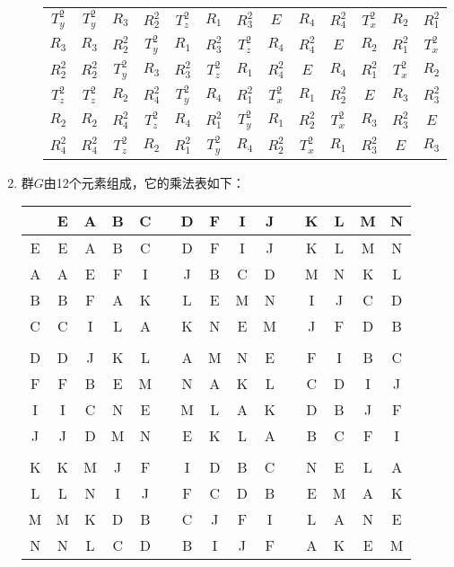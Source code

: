 \documentclass[reqno,a4paper,12pt]{amsart}
\begin{document}
\begin{enumerate}[1.]
\begin{tcolorbox}[breakable, colback = black!5!white, colframe = black]
\begin{enumerate}[(1)]
\begin{table}[H]
\begin{tabular}{|c|ccc|ccc|ccc|ccc|}
	\hline 
	$T_y^2$ & $T_y^2$ & $R_3$ & $R_2^2$ & $T_z^2$ & $R_1$ & $R_3^2$ & $E$ & $R_4$ & $R_4^2$ & $T_x^2$ & $R_2$ & $R_1^2$ \\
	$R_3$ & $R_3$ & $R_2^2$ & $T_y^2$ & $R_1$ & $R_3^2$ & $T_z^2$ & $R_4$ & $R_4^2$ & $E$ & $R_2$ & $R_1^2$ & $T_x^2$ \\
	$R_2^2$ & $R_2^2$ & $T_y^2$ & $R_3$ & $R_3^2$ & $T_z^2$ & $R_1$ & $R_4^2$ & $E$ & $R_4$ & $R_1^2$ & $T_x^2$ & $R_2$ \\
	\hline 
	$T_z^2$ & $T_z^2$ & $R_2$ & $R_4^2$ & $T_y^2$ & $R_4$ & $R_1^2$ & $T_x^2$ & $R_1$ & $R_2^2$ & $E$ & $R_3$ & $R_3^2$ \\
	$R_2$ & $R_2$ & $R_4^2$ & $T_z^2$ & $R_4$ & $R_1^2$ & $T_y^2$ & $R_1$ & $R_2^2$ & $T_x^2$ & $R_3$ & $R_3^2$ & $E$ \\
	$R_4^2$ & $R_4^2$ & $T_z^2$ & $R_2$ & $R_1^2$ & $T_y^2$ & $R_4$ & $R_2^2$ & $T_x^2$ & $R_1$ & $R_3^2$ & $E$ & $R_3$ \\
	\hline
\end{tabular}
\end{table}
\end{enumerate}
\end{tcolorbox}

\newpage

\item 群$G$由12个元素组成，它的乘法表如下：
\begin{table}[H]
\centering
\begin{tabular}{c|cccc|c|cccc|c|cccc}
	 & E & A & B & C && D & F & I & J && K & L & M & N \\
	\hline
	E & E & A & B & C && D & F & I & J && K & L & M & N \\ 
	A & A & E & F & I && J & B & C & D && M & N & K & L \\
	B & B & F & A & K && L & E & M & N && I & J & C & D \\
	C & C & I & L & A && K & N & E & M && J & F & D & B \\
	&&&&&&&&&&&&&& \\
	D & D & J & K & L && A & M & N & E && F & I & B & C \\
	F & F & B & E & M && N & A & K & L && C & D & I & J \\
	I & I & C & N & E && M & L & A & K && D & B & J & F \\
	J & J & D & M & N && E & K & L & A && B & C & F & I \\
	&&&&&&&&&&&&&& \\
	K & K & M & J & F && I & D & B & C && N & E & L & A \\
	L & L & N & I & J && F & C & D & B && E & M & A & K \\
	M & M & K & D & B && C & J & F & I && L & A & N & E \\
	N & N & L & C & D && B & I & J & F && A & K & E & M \\
\end{tabular}
\end{table}


\end{enumerate}
\end{document}
